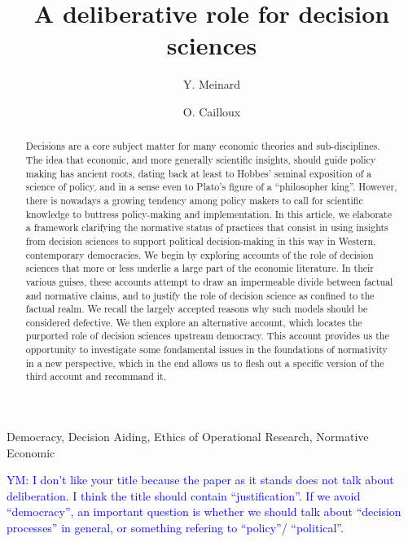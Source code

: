 \documentclass[preprint, french, english, 11pt, authoryear]{elsarticle}%
\newcommand{\commentYM}[1]{\textcolor{blue}{YM: #1}}
\begin{document}
\title{A deliberative role for decision sciences}

\author[ld]{Y. Meinard}
\author[ld]{O. Cailloux}
\address[ld]{Universit\'e Paris-Dauphine, PSL Research University, CNRS, UMR [7243], LAMSADE, 75016 PARIS, FRANCE}

\begin{abstract}
Decisions are a core subject matter for many economic theories and sub-disciplines. The idea that economic, and more generally scientific insights, should guide policy making has ancient roots, dating back at least to Hobbes’ seminal exposition of a science of policy, and in a sense even to Plato's figure of a ``philosopher king''. However, there is nowadays a growing tendency among policy makers to call for scientific knowledge to buttress policy-making and implementation. In this article, we elaborate a framework clarifying the normative status of practices that consist in using insights from decision sciences to support political decision-making in this way in Western, contemporary democracies. We begin by exploring accounts of the role of decision sciences that more or less underlie a large part of the economic literature. In their various guises, these accounts attempt to draw an impermeable divide between factual and normative claims, and to justify the role of decision science as confined to the factual realm. We recall the largely accepted reasons why such models should be considered defective. We then explore an alternative account, which locates the purported role of decision sciences upstream democracy. This account provides us the opportunity to investigate some fondamental issues in the foundations of normativity in a new perspective, which in the end allows us to flesh out a specific version of the third account and recommand it.
\end{abstract}

\begin{keyword}
Democracy, Decision Aiding, Ethics of Operational Research, Normative Economic
\end{keyword}

\maketitle
\commentYM{I don't like your title because the paper as it stands does not talk about deliberation. I think the title should contain ``justification''. If we avoid ``democracy'', an important question is whether we should talk about ``decision processes'' in general, or something refering to ``policy''/ ``political''. }
\end{document}
